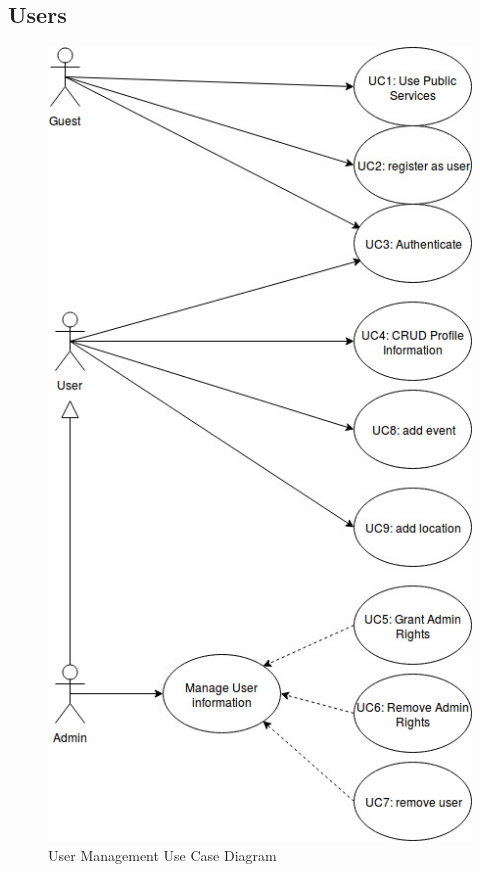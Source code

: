 \documentclass[11pt]{article}
\begin{document}
	\subsection{Users}
	\begin{figure}[!h]
        \centering
        \includegraphics[width=\textwidth]{Diagrams/UserManagement/UserUseCaseDiagram}
        \caption{User Management Use Case Diagram}
        \label{fig:user_use_case}
    \end{figure}
	
\end{document}

